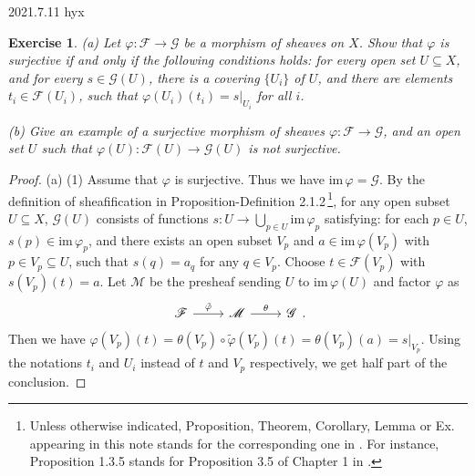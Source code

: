 \documentclass{amsart}
\newtheorem{exe}{Exercise}[subsection]
\theoremstyle{remark}\newtheorem{rmk}[theorem]{Remark}
\begin{document}
2021.7.11 hyx
\begin{exe}
	\label{2.1.3}
    (a) Let $\varphi :\mathscr{F} \rightarrow\mathscr{G} $ be a morphism of sheaves on $X$. Show that
    $\varphi$ is surjective if and only if the following conditions holds: for every open set $U\subseteq X$, and for
    every $s\in\mathscr{G}(U)$, there is a covering $\{U_i\}$ of $U$, and there are elements $t_i\in\mathscr{F}(U_i)$,
    such that $\varphi(U_i)(t_i)=s|_{U_i}$ for all $i$.

    (b) Give an example of a surjective morphism of sheaves $\varphi :\mathscr{F} \rightarrow  \mathscr{G} $,
    and an open set $U$ such that $\varphi(U):\mathscr{F}(U) \rightarrow  \mathscr{G}(U) $ is not surjective.
\end{exe}

\begin{proof}
    (a) (1) Assume that $\varphi$ is surjective. Thus we have $\mathrm{im}\,\varphi=\mathscr{G}$. By the definition of sheafification in Proposition-Definition 2.1.2\,\footnote{Unless otherwise indicated, Proposition, Theorem, Corollary, Lemma or Ex. appearing in this note stands for the corresponding one in \cite{HAR}. For instance, Proposition 1.3.5 stands for Proposition 3.5 of Chapter 1 in \cite{HAR}.}, for any open subset $U\subseteq X$, $\mathscr{G}(U)$ consists of functions $s:U\to\bigcup_{p\in U}\mathrm{im}\,\varphi_p$ satisfying: for each $p\in U$, $s(p)\in\mathrm{im}\,\varphi_p$, and there exists an open subset $V_p$ and $a\in \mathrm{im}\,\varphi(V_p)$ with $p\in V_p \subseteq U$, such that
    $s(q)=a_q$ for any $q\in V_p$. Choose $t\in\mathscr{F}(V_p)$ with $s(V_p)(t)=a$. Let $\mathscr{M}$ be the presheaf sending $U$ to $\mathrm{im}\,\varphi(U)$ and factor $\varphi$ as
    \begin{equation*}
    	\begin{tikzcd}
    		\mathscr{F} \arrow[r, "\tilde{\varphi}"] & \mathscr{M} \arrow[r, "\theta"] & \mathscr{G}
    	\end{tikzcd}.
    \end{equation*}
    Then we have $\varphi(V_p)(t)=\theta(V_p)\circ\tilde{\varphi}(V_p)(t)=\theta(V_p)(a)=s|_{V_p}$. Using the notations $t_i$ and $U_i$ instead of $t$ and $V_p$ respectively, we get half part of the conclusion.
    

\end{proof}
\end{document}
